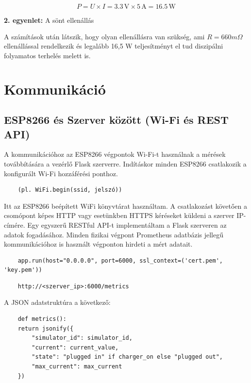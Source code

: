 \begin{equation}
    P = U \times I = 3.3 \, \text{V} \times 5 \, \text{A} = 16.5 \, \text{W}
\end{equation}
\begin{center}
    \textbf{2. egyenlet:} A sönt ellenállás
\end{center}

A számítások után látszik, hogy olyan ellenállásra van szükség, ami $R = 660 m\Omega$ ellenállással rendelkezik és legalább 16,5 W 
teljesítményt el tud diszipálni folyamatos terhelés melett is.


\section{Kommunikáció}

\subsection{ESP8266 és Szerver között (Wi-Fi és REST API)}

A kommunikációhoz az ESP8266 végpontok Wi-Fi-t használnak a mérések továbbítására a vezérlő Flask szerverre. 
Indításkor minden ESP8266 csatlakozik a konfigurált 
Wi-Fi hozzáférési ponthoz. 
\begin{lstlisting}
    (pl. WiFi.begin(ssid, jelszó))
\end{lstlisting}
Itt az ESP8266 beépített WiFi könyvtárat használtam.
\cite{techtutorialsx:esp8266flask}
A csatlakozást követően a csomópont képes HTTP vagy esetünkben HTTPS kéréseket küldeni a szerver IP-címére. 
Egy egyszerű RESTful API-t implementáltam a Flask szerveren az adatok fogadásához. 
Minden fizikai végpont Prometheus adatbázis jellegű kommunikációhoz is használt végponton hirdeti a mért adatait.
\begin{lstlisting}
    app.run(host="0.0.0.0", port=6000, ssl_context=('cert.pem', 'key.pem'))
\end{lstlisting}

\begin{lstlisting}
    http://<szerver_ip>:6000/metrics
\end{lstlisting} 
A JSON adatstruktúra a következő:

\begin{lstlisting}
    def metrics():
    return jsonify({
        "simulator_id": simulator_id,
        "current": current_value,
        "state": "plugged in" if charger_on else "plugged out",
        "max_current": max_current
    })
\end{lstlisting}

